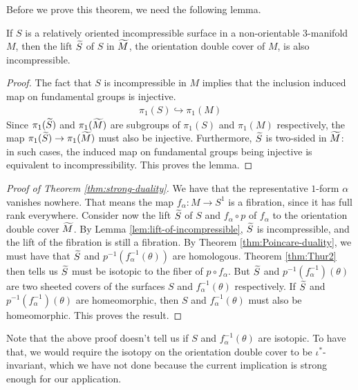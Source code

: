 Before we prove this theorem, we need the following lemma.
\begin{lem}
  \label{lem:lift-of-incompressible}
  If $S$ is a relatively oriented incompressible surface in a non-orientable $3$-manifold $M$, then the lift $\widetilde{S}$ of $S$ in $\widetilde{M}$, the orientation double cover of $M$, is also incompressible.
\end{lem}
\begin{proof}
  The fact that $S$ is incompressible in $M$ implies that the inclusion induced map on fundamental groups is injective.
  \begin{align*}
    \pi_1(S) \hookrightarrow \pi_1(M)
  \end{align*}
  Since $\pi_1(\widetilde{S})$ and $\pi_1(\widetilde{M})$ are subgroups of $\pi_1(S)$ and $\pi_1(M)$ respectively, the map $\pi_1(\widetilde{S}) \to \pi_1(\widetilde{M})$ must also be injective.
  Furthermore, $\widetilde{S}$ is two-sided in $\widetilde{M}$: in such cases, the induced map on fundamental groups being injective is equivalent to incompressibility.
  This proves the lemma.
\end{proof}

\begin{proof}[Proof of Theorem \ref{thm:strong-duality}]
  We have that the representative $1$-form $\alpha$ vanishes nowhere.
  That means the map $f_{\alpha}: M \to S^1$ is a fibration, since it has full rank everywhere.
  Consider now the lift $\widetilde{S}$ of $S$ and $f_{\alpha} \circ p$ of $f_{\alpha}$ to the orientation double cover $\widetilde{M}$.
  By Lemma \ref{lem:lift-of-incompressible}, $\widetilde{S}$ is incompressible, and the lift of the fibration is still a fibration.
  By Theorem \ref{thm:Poincare-duality}, we must have that $\widetilde{S}$ and $p^{-1}(f_{\alpha}^{-1}(\theta))$ are homologous.
  Theorem \ref{thm:Thur2} then tells us $\widetilde{S}$ must be isotopic to the fiber of $p \circ f_{\alpha}$.
  But $\widetilde{S}$ and $p^{-1}(f_{\alpha}^{-1})(\theta)$ are two sheeted covers of the surfaces $S$ and $f_{\alpha}^{-1}(\theta)$ respectively.
  If $\widetilde{S}$ and $p^{-1}(f_{\alpha}^{-1})(\theta)$ are homeomorphic, then $S$ and $f_{\alpha}^{-1}(\theta)$ must also be homeomorphic.
  This proves the result.
\end{proof}

\begin{rem}
  Note that the above proof doesn't tell us if $S$ and $f_{\alpha}^{-1}(\theta)$ are isotopic.
  To have that, we would require the isotopy on the orientation double cover to be $\iota^{\ast}$-invariant, which we have not done because the current implication is strong enough for our application.
\end{rem}

